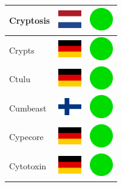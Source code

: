 \documentclass[12pt, a4paper, twoside]{report}
\begin{document}
\begin{center}
\begin{longtable}{|p{5cm}|p{2cm}|p{2cm}|}
 Cryptosis                                                  & \includegraphics[width=1cm]{../4x3/nl} &   \includegraphics[width=1cm]{../likes/y} \\ \hline
 Crypts                                                     & \includegraphics[width=1cm]{../4x3/de} &   \includegraphics[width=1cm]{../likes/y} \\ \hline
 Ctulu                                                      & \includegraphics[width=1cm]{../4x3/de} &   \includegraphics[width=1cm]{../likes/y} \\ \hline
 Cumbeast                                                   & \includegraphics[width=1cm]{../4x3/fi} &   \includegraphics[width=1cm]{../likes/y} \\ \hline
 Cypecore                                                   & \includegraphics[width=1cm]{../4x3/de} &   \includegraphics[width=1cm]{../likes/y} \\ \hline
 Cytotoxin                                                  & \includegraphics[width=1cm]{../4x3/de} &   \includegraphics[width=1cm]{../likes/y} \\ \hline

\end{longtable}
\end{center}
\end{document}
